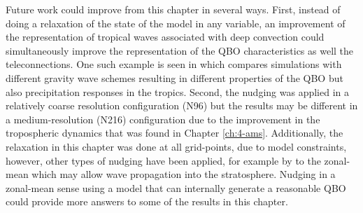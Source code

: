 Future work could improve from this chapter in several ways. 
First, instead of doing a relaxation of the state of the model in any variable, an improvement of the representation of tropical waves associated with deep convection could simultaneously improve the representation of the QBO characteristics as well the teleconnections. One such example is seen in \cite{serva2021} which compares simulations with different gravity wave schemes resulting in different properties of the QBO but also precipitation responses in the tropics. 
Second, the nudging was applied in a relatively coarse resolution configuration (N96) but the results may be different in a medium-resolution (N216) configuration due to the improvement in the tropospheric dynamics that was found in Chapter \ref{ch:4-ams}. 
Additionally, the relaxation in this chapter was done at all grid-points, due to model constraints, however, other types of nudging have been applied, for example by \cite{martin2021} to the zonal-mean which may allow wave propagation into the stratosphere. Nudging in a zonal-mean sense using a model that can internally generate a reasonable QBO could provide more answers to some of the results in this chapter.

